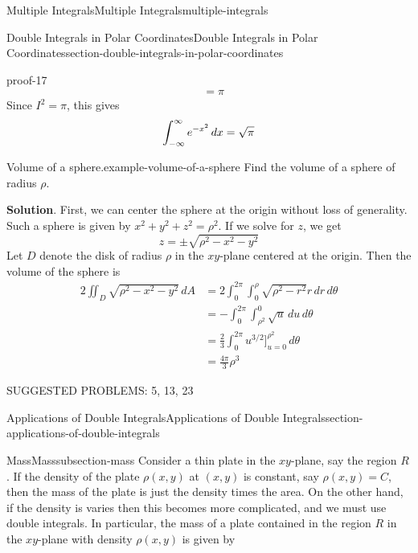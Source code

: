 \documentclass[oneside,10pt,]{book}
\renewcommand{\qedhere}{\relax}
\numberwithin{equation}{section}
\begin{document}
\begin{chapterptx}{Multiple Integrals}{}{Multiple Integrals}{}{}{multiple-integrals}
\begin{sectionptx}{Double Integrals in Polar Coordinates}{}{Double Integrals in Polar Coordinates}{}{}{section-double-integrals-in-polar-coordinates}
\begin{proofptx}{}{proof-17}
\begin{align*}
& = \pi 
\end{align*}
Since \(I^{2} = \pi\), this gives%
\begin{equation*}
\int_{-\infty}^{\infty}e^{-x^{2}}\,dx = \sqrt{\pi}\qedhere
\end{equation*}
%
\end{proofptx}
\begin{example}{Volume of a sphere.}{example-volume-of-a-sphere}%
\hypertarget{p-1497}{}%
Find the volume of a sphere of radius \(\rho\).%
\par\smallskip%
\noindent\textbf{Solution}.\hypertarget{solution-245}{}\quad%
\hypertarget{p-1498}{}%
First, we can center the sphere at the origin without loss of generality. Such a sphere is given by \(x^{2} + y^{2} + z^{2} = \rho^{2}\). If we solve for \(z\), we get%
\begin{equation*}
z = \pm\sqrt{\rho^{2} - x^{2} - y^{2}}
\end{equation*}
Let \(D\) denote the disk of radius \(\rho\) in the \(xy\)-plane centered at the origin. Then the volume of the sphere is%
\begin{align*}
2\iint_{D}\sqrt{\rho^{2} - x^{2} - y^{2}}\,dA & = 2\int_{0}^{2\pi}\int_{0}^{\rho}\sqrt{\rho^{2} - r^{2}}r\,dr\,d\theta \\
& = -\int_{0}^{2\pi}\int_{\rho^{2}}^{0}\sqrt{u}\,du\,d\theta \\
& = \frac{2}{3}\int_{0}^{2\pi}u^{3/2}\bigg]_{u=0}^{\rho^{2}}\,d\theta \\
& = \frac{4\pi}{3}\rho^{3} 
\end{align*}
%
\end{example}
\hypertarget{p-1499}{}%
SUGGESTED PROBLEMS: 5, 13, 23%
\end{sectionptx}
%
%
\typeout{************************************************}
\typeout{************************************************}
%
\begin{sectionptx}{Applications of Double Integrals}{}{Applications of Double Integrals}{}{}{section-applications-of-double-integrals}
%
%
\typeout{************************************************}
\typeout{************************************************}
%
\begin{subsectionptx}{Mass}{}{Mass}{}{}{subsection-mass}
\hypertarget{p-1500}{}%
Consider a thin plate in the \(xy\)-plane, say the region \(R\). If the density of the plate \(\rho(x,y)\) at \((x,y)\) is constant, say \(\rho(x,y) = C\), then the mass of the plate is just the density times the area. On the other hand, if the density is varies then this becomes more complicated, and we must use double integrals. In particular, the mass of a plate contained in the region \(R\) in the \(xy\)-plane with density \(\rho(x,y)\) is given by%

\end{subsectionptx}
\end{sectionptx}
\end{chapterptx}
\end{document}
